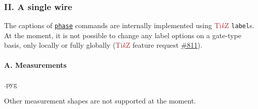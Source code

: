 \documentclass{scrartcl}
\makeatletter
\newenvironment{codeexample}{%
   \VerbatimEnvironment%
   \let\FVB@VerbatimOut\minted@FVB@VerbatimOut
   \let\FVE@VerbatimOut\minted@FVE@VerbatimOut
   \minted@configlang{tex}%
   \minted@fvset
   \begin{VerbatimOut}[codes={\catcode`\^^I=12},firstline,lastline]{\minted@jobname.pyg}%
}{
   \end{VerbatimOut}%
   \minted@langlinenoson%
   \savebox\codeexamplebox{ \minted@jobname.pyg}%
   \ifdim\wd\codeexamplebox>\dimexpr.5\linewidth-3mm\relax%
      \wd\codeexamplebox=.5\linewidth%
   \else%
      \wd\codeexamplebox=\dimexpr\wd\codeexamplebox+3mm\relax%
   \fi%
   \noindent\begin{minipage}{\wd\codeexamplebox}%
      \centering%
      \usebox\codeexamplebox%
   \end{minipage}%
   \begin{minipage}{\dimexpr\linewidth-\wd\codeexamplebox\relax}%
      \expandafter\minted@pygmentize\expandafter{\minted@lang}%
   \end{minipage}%
   \minted@langlinenosoff%
   \par%
}
\newenvironment{codeexample*}{%
   \VerbatimEnvironment%
   \let\FVB@VerbatimOut\minted@FVB@VerbatimOut
   \let\FVE@VerbatimOut\minted@FVE@VerbatimOut
   \minted@configlang{tex}%
   \minted@fvset
   \begin{VerbatimOut}[codes={\catcode`\^^I=12},firstline,lastline]{\minted@jobname.pyg}%
}{
   \end{VerbatimOut}%
   \minted@langlinenoson%
   \begin{adjustbox}{center}
       \minted@jobname.pyg %
   \end{adjustbox}\nopagebreak
   \expandafter\minted@pygmentize\expandafter{\minted@lang}%
   \minted@langlinenosoff%
   \par%
}
\def\TikZ{\textcolor{brown}{Ti\textit kZ}}
\def\gate#1{\hyperref[gate:#1]{\texttt{#1}}}
\makeatother
\begin{document}
         \subsubsection{II. A single wire}
            \begin{example}
               \begin{codeexample*}
               \end{codeexample*}
               The captions of \gate{phase} commands are internally implemented using \TikZ{} \texttt{label}s.
               At the moment, it is not possible to change any label options on a gate-type basis, only locally or fully globally (\TikZ{} feature request \href{https://github.com/pgf-tikz/pgf/issues/811}{\#811}).
            \end{example}

            \clearpage
            \paragraph{A. Measurements}\leavevmode
               \begin{example}
                  \begin{codeexample}
                  \end{codeexample}
                  Other measurement shapes are not supported at the moment.
               \end{example}
\end{document}
